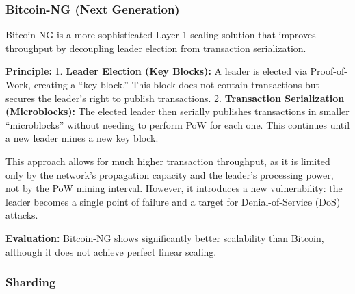 
\subsubsection{Bitcoin-NG (Next
Generation)}\label{bitcoin-ng-next-generation}

Bitcoin-NG is a more sophisticated Layer 1 scaling solution that
improves throughput by decoupling leader election from transaction
serialization.

\textbf{Principle:} 1. \textbf{Leader Election (Key Blocks):} A leader
is elected via Proof-of-Work, creating a ``key block.'' This block does
not contain transactions but secures the leader's right to publish
transactions. 2. \textbf{Transaction Serialization (Microblocks):} The
elected leader then serially publishes transactions in smaller
``microblocks'' without needing to perform PoW for each one. This
continues until a new leader mines a new key block.


This approach allows for much higher transaction throughput, as it is
limited only by the network's propagation capacity and the leader's
processing power, not by the PoW mining interval. However, it introduces
a new vulnerability: the leader becomes a single point of failure and a
target for Denial-of-Service (DoS) attacks.

\textbf{Evaluation:} Bitcoin-NG shows significantly better scalability
than Bitcoin, although it does not achieve perfect linear scaling.


\subsubsection{Sharding}\label{sharding}

